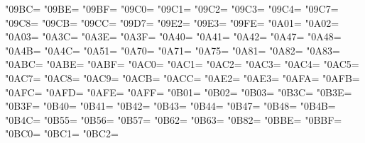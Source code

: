 \XeTeXcharclass"09BC=\KclassCM
\XeTeXcharclass"09BE=\KclassCM
\XeTeXcharclass"09BF=\KclassCM
\XeTeXcharclass"09C0=\KclassCM
\XeTeXcharclass"09C1=\KclassCM
\XeTeXcharclass"09C2=\KclassCM
\XeTeXcharclass"09C3=\KclassCM
\XeTeXcharclass"09C4=\KclassCM
\XeTeXcharclass"09C7=\KclassCM
\XeTeXcharclass"09C8=\KclassCM
\XeTeXcharclass"09CB=\KclassCM
\XeTeXcharclass"09CC=\KclassCM
\XeTeXcharclass"09D7=\KclassCM
\XeTeXcharclass"09E2=\KclassCM
\XeTeXcharclass"09E3=\KclassCM
\XeTeXcharclass"09FE=\KclassCM
\XeTeXcharclass"0A01=\KclassCM
\XeTeXcharclass"0A02=\KclassCM
\XeTeXcharclass"0A03=\KclassCM
\XeTeXcharclass"0A3C=\KclassCM
\XeTeXcharclass"0A3E=\KclassCM
\XeTeXcharclass"0A3F=\KclassCM
\XeTeXcharclass"0A40=\KclassCM
\XeTeXcharclass"0A41=\KclassCM
\XeTeXcharclass"0A42=\KclassCM
\XeTeXcharclass"0A47=\KclassCM
\XeTeXcharclass"0A48=\KclassCM
\XeTeXcharclass"0A4B=\KclassCM
\XeTeXcharclass"0A4C=\KclassCM
\XeTeXcharclass"0A51=\KclassCM
\XeTeXcharclass"0A70=\KclassCM
\XeTeXcharclass"0A71=\KclassCM
\XeTeXcharclass"0A75=\KclassCM
\XeTeXcharclass"0A81=\KclassCM
\XeTeXcharclass"0A82=\KclassCM
\XeTeXcharclass"0A83=\KclassCM
\XeTeXcharclass"0ABC=\KclassCM
\XeTeXcharclass"0ABE=\KclassCM
\XeTeXcharclass"0ABF=\KclassCM
\XeTeXcharclass"0AC0=\KclassCM
\XeTeXcharclass"0AC1=\KclassCM
\XeTeXcharclass"0AC2=\KclassCM
\XeTeXcharclass"0AC3=\KclassCM
\XeTeXcharclass"0AC4=\KclassCM
\XeTeXcharclass"0AC5=\KclassCM
\XeTeXcharclass"0AC7=\KclassCM
\XeTeXcharclass"0AC8=\KclassCM
\XeTeXcharclass"0AC9=\KclassCM
\XeTeXcharclass"0ACB=\KclassCM
\XeTeXcharclass"0ACC=\KclassCM
\XeTeXcharclass"0AE2=\KclassCM
\XeTeXcharclass"0AE3=\KclassCM
\XeTeXcharclass"0AFA=\KclassCM
\XeTeXcharclass"0AFB=\KclassCM
\XeTeXcharclass"0AFC=\KclassCM
\XeTeXcharclass"0AFD=\KclassCM
\XeTeXcharclass"0AFE=\KclassCM
\XeTeXcharclass"0AFF=\KclassCM
\XeTeXcharclass"0B01=\KclassCM
\XeTeXcharclass"0B02=\KclassCM
\XeTeXcharclass"0B03=\KclassCM
\XeTeXcharclass"0B3C=\KclassCM
\XeTeXcharclass"0B3E=\KclassCM
\XeTeXcharclass"0B3F=\KclassCM
\XeTeXcharclass"0B40=\KclassCM
\XeTeXcharclass"0B41=\KclassCM
\XeTeXcharclass"0B42=\KclassCM
\XeTeXcharclass"0B43=\KclassCM
\XeTeXcharclass"0B44=\KclassCM
\XeTeXcharclass"0B47=\KclassCM
\XeTeXcharclass"0B48=\KclassCM
\XeTeXcharclass"0B4B=\KclassCM
\XeTeXcharclass"0B4C=\KclassCM
\XeTeXcharclass"0B55=\KclassCM
\XeTeXcharclass"0B56=\KclassCM
\XeTeXcharclass"0B57=\KclassCM
\XeTeXcharclass"0B62=\KclassCM
\XeTeXcharclass"0B63=\KclassCM
\XeTeXcharclass"0B82=\KclassCM
\XeTeXcharclass"0BBE=\KclassCM
\XeTeXcharclass"0BBF=\KclassCM
\XeTeXcharclass"0BC0=\KclassCM
\XeTeXcharclass"0BC1=\KclassCM
\XeTeXcharclass"0BC2=\KclassCM
